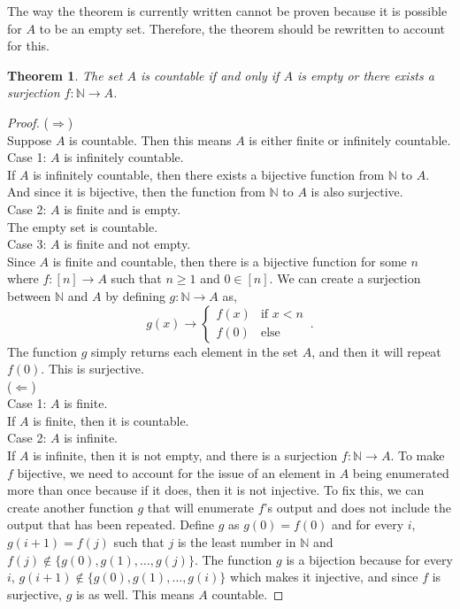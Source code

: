 \documentclass[11pt]{article}
\newtheorem{theorem}{Theorem}
\newcommand{\N}{\mathbb{N}}
\begin{document}
The way the theorem is currently written cannot be proven because it is possible for $A$ to be an empty set. Therefore, the theorem should be rewritten to account for this.

\begin{theorem}
	The set $A$ is countable if and only if $A$ is empty or there exists a surjection $f : \N \rightarrow A$.
\end{theorem}

\begin{proof}
	($\Longrightarrow$)\\
	Suppose $A$ is countable. Then this means $A$ is either finite or infinitely countable.\\
	Case 1: $A$ is infinitely countable.\\
	If $A$ is infinitely countable, then there exists a bijective function from $\N$ to $A$. And since it is bijective, then the function from $\N$ to $A$ is also surjective.\\
	Case 2: $A$ is finite and is empty.\\
	The empty set is countable.\\
	Case 3: $A$ is finite and not empty.\\
	Since $A$ is finite and countable, then there is a bijective function for some $n$ where $f:[n] \rightarrow A$ such that $n \ge 1$ and $0 \in [n]$. We can create a surjection between $\N$ and $A$ by defining $g: \N \rightarrow A$ as,
	\begin{equation*}
		g(x) \rightarrow
		\begin{cases}
			f(x) & \text{if $x < n$}\\
			f(0) & \text{else}
		\end{cases}\,.
	\end{equation*}
	The function $g$ simply returns each element in the set $A$, and then it will repeat $f(0)$. This is surjective.\\
	($\Longleftarrow$)\\
	Case 1: $A$ is finite.\\
	If $A$ is finite, then it is countable.\\
	Case 2: $A$ is infinite.\\
	If $A$ is infinite, then it is not empty, and there is a surjection $f: \N \rightarrow A$. To make $f$ bijective, we need to account for the issue of an element in $A$ being enumerated more than once because if it does, then it is not injective. To fix this, we can create another function $g$ that will enumerate $f$'s output and does not include the output that has been repeated. Define $g$ as $g(0) = f(0)$ and for every $i$, $g(i+1) = f(j)$ such that $j$ is the least number in $\N$ and $f(j) \not\in \{g(0), g(1), \ldots, g(j)\}$. The function $g$ is a bijection because for every $i$, $g(i+1) \not\in \{g(0), g(1), \ldots, g(i)\}$ which makes it injective, and since $f$ is surjective, $g$ is as well. This means $A$ countable.  
\end{proof}
\end{document}
